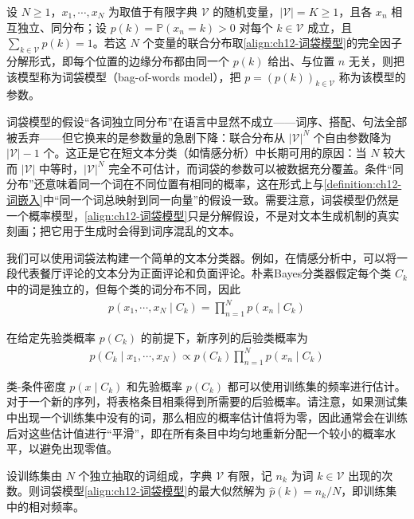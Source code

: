 \documentclass[../../main.tex]{subfiles}
\begin{document}
\begin{definition}[词袋模型]\label{definition:ch12-词袋模型}
设 $N\geqslant1$，$x_1,\cdots,x_N$ 为取值于有限字典 $\mathcal{V}$ 的随机变量，$|\mathcal{V}|=K\geqslant1$，且各 $x_n$ 相互独立、同分布；设 $p(k)=\mathbb{P}(x_n=k)>0$ 对每个 $k\in\mathcal{V}$ 成立，且 $\sum_{k\in\mathcal{V}}p(k)=1$。若这 $N$ 个变量的联合分布取\eqref{align:ch12-词袋模型}的完全因子分解形式，即每个位置的边缘分布都由同一个 $p(k)$ 给出、与位置 $n$ 无关，则把该模型称为词袋模型（bag-of-words model），把 $p=(p(k))_{k\in\mathcal{V}}$ 称为该模型的参数。
\end{definition}

\begin{remark}
词袋模型的假设“各词独立同分布”在语言中显然不成立——词序、搭配、句法全部被丢弃——但它换来的是参数量的急剧下降：联合分布从 $|\mathcal{V}|^{N}$ 个自由参数降为 $|\mathcal{V}|-1$ 个。这正是它在短文本分类（如情感分析）中长期可用的原因：当 $N$ 较大而 $|\mathcal{V}|$ 中等时，$|\mathcal{V}|^{N}$ 完全不可估计，而词袋的参数可以被数据充分覆盖。条件“同分布”还意味着同一个词在不同位置有相同的概率，这在形式上与\cref{definition:ch12-词嵌入}中“同一个词总映射到同一向量”的假设一致。需要注意，词袋模型仍然是一个概率模型，\eqref{align:ch12-词袋模型}只是分解假设，不是对文本生成机制的真实刻画；把它用于生成时会得到词序混乱的文本。
\end{remark}

我们可以使用词袋法构建一个简单的文本分类器。例如，在情感分析中，可以将一段代表餐厅评论的文本分为正面评论和负面评论。朴素Bayes分类器假定每个类 $C_k$ 中的词是独立的，但每个类的词分布不同，因此
\begin{align}
p(x_1,\cdots,x_N\mid C_k)=\prod_{n=1}^{N}p(x_n\mid C_k)
\label{align:ch12-词袋类条件}
\end{align}

在给定先验类概率 $p(C_k)$ 的前提下，新序列的后验类概率为
\begin{align}
p(C_k\mid x_1,\cdots,x_N)\propto p(C_k)\prod_{n=1}^{N}p(x_n\mid C_k)
\label{align:ch12-词袋后验}
\end{align}

类-条件密度 $p(x\mid C_k)$ 和先验概率 $p(C_k)$ 都可以使用训练集的频率进行估计。对于一个新的序列，将表格条目相乘得到所需要的后验概率。请注意，如果测试集中出现一个训练集中没有的词，那么相应的概率估计值将为零，因此通常会在训练后对这些估计值进行“平滑”，即在所有条目中均匀地重新分配一个较小的概率水平，以避免出现零值。

\begin{proposition}[词袋模型的最大似然解]\label{proposition:ch12-词袋最大似然}
设训练集由 $N$ 个独立抽取的词组成，字典 $\mathcal{V}$ 有限，记 $n_k$ 为词 $k\in\mathcal{V}$ 出现的次数。则词袋模型\eqref{align:ch12-词袋模型}的最大似然解为 $\hat{p}(k)=n_k/N$，即训练集中的相对频率。
\end{proposition}
\end{document}
